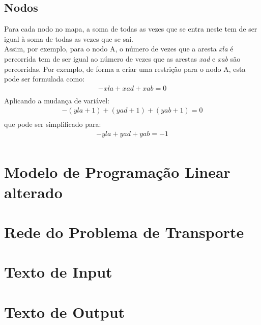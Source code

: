 \documentclass[a4paper]{report}
\begin{document}
\subsection{Nodos}
Para cada nodo no mapa, a soma de todas as vezes que se entra neste
tem de ser igual à soma de todas as vezes que se sai.\\
Assim, por exemplo, para o nodo A, o número de vezes que a aresta
\textit{xla} é percorrida tem de ser igual ao número de vezes que
as arestas \textit{xad} e \textit{xab} são percorridas.
Por exemplo, de forma a criar uma restrição para o nodo A, esta pode ser
formulada como:\\
\begin{multline}
- xla + xad + xab = 0 \\
\end{multline}
Aplicando a mudança de variável:
\begin{multline}
- (yla + 1) + (yad +1) + (yab +1) = 0 \\
\end{multline}
que pode ser simplificado para:
\begin{multline}
- yla + yad + yab = -1\\
\end{multline}

\pagebreak
\section{Modelo de Programação Linear alterado}


\pagebreak
\section{Rede do Problema de Transporte}


\pagebreak
\section{Texto de Input}
\label{input}


\pagebreak
\section{Texto de Output}
\label{input}



\pagebreak
\end{document}
